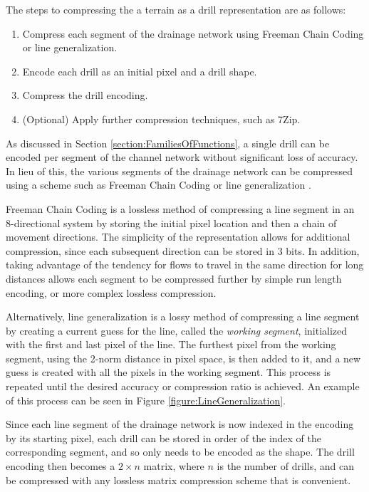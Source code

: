 The steps to compressing the a terrain as a drill representation are as follows:

\begin{enumerate}
  \item Compress each segment of the drainage network using Freeman Chain Coding or line generalization.
  \item Encode each drill as an initial pixel and a drill shape.
  \item Compress the drill encoding.
  \item (Optional) Apply further compression techniques, such as 7Zip.
\end{enumerate}

As discussed in Section \ref{section:FamiliesOfFunctions}, a single drill can be encoded per segment of the channel network without significant loss of accuracy. In lieu of this, the various segments of the drainage network can be compressed using a scheme such as Freeman Chain Coding \cite{Freeman:1974:CPL:356625.356627} or line generalization \cite{Ramar72:Polygonalapproximation}. 

Freeman Chain Coding is a lossless method of compressing a line segment in an 8-directional system by storing the initial pixel location and then a chain of movement directions. The simplicity of the representation allows for additional compression, since each subsequent direction can be stored in 3 bits. In addition, taking advantage of the tendency for flows to travel in the same direction for long distances allows each segment to be compressed further by simple run length encoding, or more complex lossless compression.
 
Alternatively, line generalization is a lossy method of compressing a line segment by creating a current guess for the line, called the \textit{working segment}, initialized with the first and last pixel of the line.
The furthest pixel from the working segment, using the 2-norm distance in pixel space, is then added to it, and a new guess is created with all the pixels in the working segment. This process is repeated until the desired accuracy or compression ratio is achieved. An example of this process can be seen in Figure \ref{figure:LineGeneralization}.

Since each line segment of the drainage network is now indexed in the encoding by its starting pixel, each drill can be stored in order of the index of the corresponding segment, and so only needs to be encoded as the shape. The drill encoding then becomes a $2 \times n$ matrix, where $n$ is the number of drills, and can be compressed with any lossless matrix compression scheme that is convenient. 

